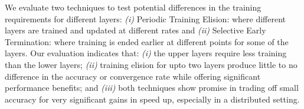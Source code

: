 We evaluate two techniques to test potential differences in the training requirements for different layers: \emph{(i)} Periodic Training Elision: where different layers are trained and updated at different rates and \emph{(ii)} Selective Early Termination: where training is ended earlier at different points for some of the layers. Our evaluation indicates that: \emph{(i)} the upper layers require less training than the lower layers; \emph{(ii)} training elision for upto two layers produce little to no difference in the accuracy or convergence rate while offering significant performance benefits; and \emph{(iii)} both techniques show promise in trading off small accuracy for very significant gains in speed up, especially in a distributed setting. 

